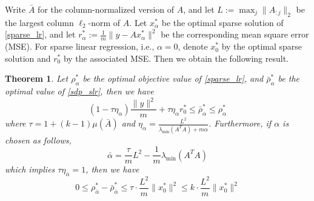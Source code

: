 \documentclass[11pt]{amsart}
\theoremstyle{plain}
\newtheorem{thm}{Theorem}[section]
\theoremstyle{definition}
\theoremstyle{remark}
\begin{document}
	Write \(\bar A\) for the column-normalized version of \(A\), and let \(L:=\max_j \|A_{:j}\|_2\) be the largest column \(\ell_2\)-norm of \(A\). Let $x^*_{\alpha}$ be the optimal sparse solution of \eqref{sparse_lr}, and let $r^*_{\alpha} := \frac{1}{m}\|y - Ax^*_{\alpha}\|^2$ be the corresponding mean square error (MSE). For sparse linear regression, i.e., $\alpha=0$, denote $x^*_0$ by the optimal sparse solution and $r^*_0$ by the associated MSE. Then we obtain the following result.
	
	\begin{thm}
		Let $\rho^*_{\alpha}$ be the optimal objective value of \eqref{sparse_lr}, and $\bar\rho^*_{\alpha}$ be the optimal value of \eqref{sdp_slr}, then we have
		\begin{equation}
			(1-\tau\eta_\alpha)\frac{\|y\|^2}{m} + \tau \eta_\alpha r^*_{0} \leq\bar\rho^*_{\alpha} \leq \rho^*_{\alpha}
		\end{equation}
		where $\tau = 1 + (k-1)\mu(\bar A)$ and $\eta_\alpha = \frac{L^2}{\lambda_{\min}(A^TA)+m\alpha}$. Furthermore, if $\alpha$ is chosen as follows,
		\[
		\bar \alpha=\frac{\tau}{m} L^2 - \frac{1}{m}\lambda_{\min}(A^TA)
		\]
		which implies $\tau\eta_{\bar\alpha}=1$, then we have
		\begin{equation}
			0\leq \rho^*_{\bar\alpha} - \bar\rho^*_{\bar\alpha} \leq \tau \cdot \frac{L^2}{m}\|x^*_0\|^2 \leq k \cdot \frac{L^2}{m}\|x^*_0\|^2
		\end{equation}
	\end{thm}
	
\end{document}

